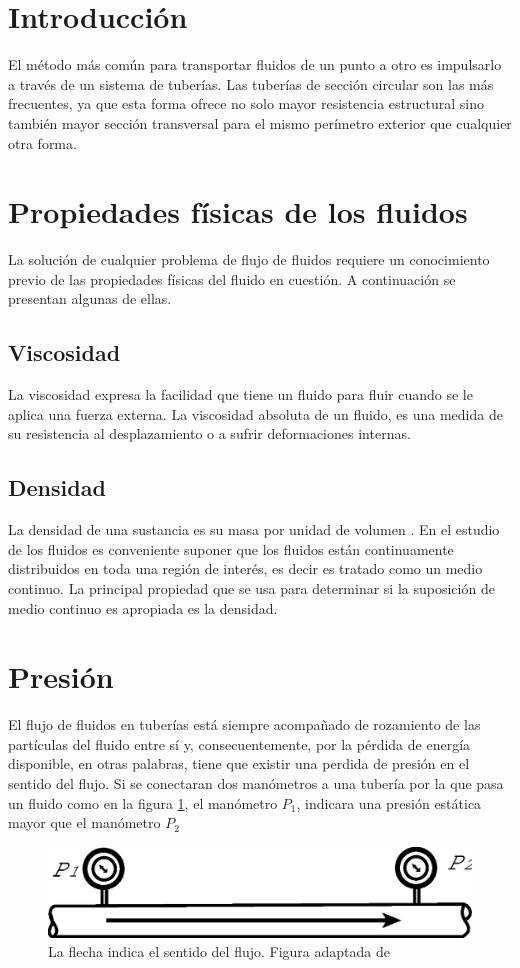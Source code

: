 \documentclass[11pt,letterpaper]{article}
\begin{document}
	\section{Introducción}
	
	El método más común para transportar fluidos de un punto a otro es impulsarlo a través de un sistema de tuberías. Las tuberías de sección circular son las más frecuentes, ya que esta forma ofrece no solo mayor resistencia estructural sino también mayor sección transversal para el mismo perímetro exterior que cualquier otra forma. \parencite[1.1]{crane}
	
	\section{Propiedades físicas de los fluidos}
	
	La solución de cualquier problema de flujo de fluidos requiere un conocimiento previo de las propiedades físicas del fluido en cuestión. A continuación se presentan algunas de ellas.
	
	\subsection{Viscosidad}
	
	La viscosidad expresa la facilidad que tiene un fluido para fluir cuando se le aplica una fuerza externa. La viscosidad absoluta de un fluido, es una medida de su resistencia al desplazamiento o  a sufrir deformaciones internas. \parencite[1.2]{crane}
	
	\subsection{Densidad}
	
	La densidad de una sustancia es su masa por unidad de volumen \parencite{crane}. En el estudio de los fluidos es conveniente suponer que los fluidos están continuamente distribuidos en toda una región de interés, es decir es tratado como un medio continuo. La principal propiedad que se usa para determinar si la suposición de medio continuo es apropiada es la densidad.\parencite[10]{merle}
	
	\section{Presión}
	
	El flujo de fluidos en tuberías está siempre acompañado de rozamiento de las partículas del fluido entre sí y, consecuentemente, por la pérdida de energía disponible, en otras palabras, tiene que existir una perdida de presión en el sentido del flujo. Si se conectaran dos manómetros a una tubería por la que pasa un fluido como en la figura \ref{tuberia}, el manómetro $P_1$, indicara una presión estática mayor que el manómetro $P_2$ \parencite[1.7]{crane}
	
		\begin{figure}[H]
			\centering
			\includegraphics[width=0.6\linewidth]{Vectores/Tuberia_manometros}
			\caption{La flecha indica el sentido del flujo. Figura adaptada de \parencite[1.7]{crane}}
			\label{tuberia}
		\end{figure}
	
	\printbibliography[title={Referencias}]
	
\end{document}
